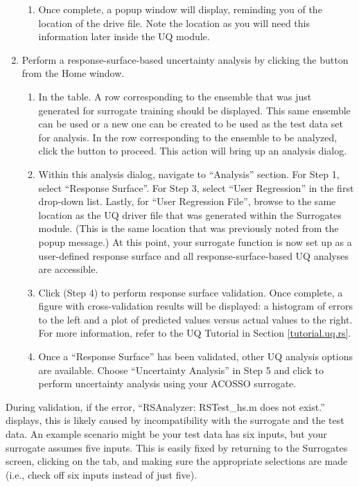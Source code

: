 \begin{enumerate}
{\begin{enumerate}
\item{Once complete, a popup window will display, reminding you of the
  location of the drive file. Note the location as you will need this
  information later inside the UQ module.} 
\end{enumerate}
}
\item{Perform a response-surface-based uncertainty analysis by clicking the 
   button from the Home window.
\begin{enumerate}
\item{In the  table. A row corresponding to the ensemble that was just
  generated for surrogate training should be displayed. This same ensemble can be used or
  a new one can be created to be used as the test data set for analysis. 
  In the row corresponding to the ensemble
  to be analyzed, click the  button to proceed. This
  action will bring up an analysis dialog.} 
\item{Within this analysis dialog, navigate to ``Analysis'' section. For
  Step 1, select ``Response Surface''. For Step 3, select ``User
  Regression'' in the first drop-down list. Lastly, for ``User Regression File'',
  browse to the same location as the UQ driver file that was
  generated within the Surrogates module. (This is the same location that
  was previously noted from the popup message.) 
  At this point, your surrogate function is now set up as a user-defined
  response surface and all response-surface-based UQ analyses are accessible.}
\item{Click  (Step 4) to perform response surface validation. Once
  complete, a figure with cross-validation results will be displayed: 
  a histogram of errors to the left and a plot of predicted values versus
  actual values to the right. For more information, refer to the UQ
  Tutorial in Section \ref{tutorial.uq.rs}.}
\item{Once a ``Response Surface'' has been validated, other UQ analysis options
  are available. Choose ``Uncertainty Analysis'' in Step 5 and click
   to perform uncertainty analysis using your ACOSSO surrogate.}
\end{enumerate}
}
\end{enumerate}

During validation, if the error, ``RSAnalyzer: RSTest\_hs.m does
not exist.'' displays, this is likely caused by incompatibility with the surrogate
and the test data. An example scenario might be your test data has six
inputs, but your surrogate assumes five inputs. This is easily fixed by
returning to the Surrogates screen, clicking on the 
tab, and making sure the appropriate selections are made (i.e., check off six
inputs instead of just five).
